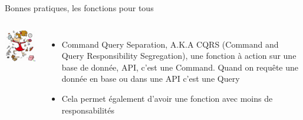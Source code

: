\documentclass{beamer}
\begin{document}
    \begin{frame}{Bonnes pratiques, les fonctions pour tous}
        \begin{columns}

            \centering
            \includegraphics[width=5cm]{image/doing-many-things}

            \begin{itemize}

                \item Command Query Separation, A.K.A CQRS (Command and Query Responsibility Segregation), une fonction à action sur une base de donnée, API, c'est une Command.
                Quand on requête une donnée en base ou dans une API c'est une Query
                \item Cela permet également d'avoir une fonction avec moins de responsabilités

            \end{itemize}

        \end{columns}
    \end{frame}
\end{document}
